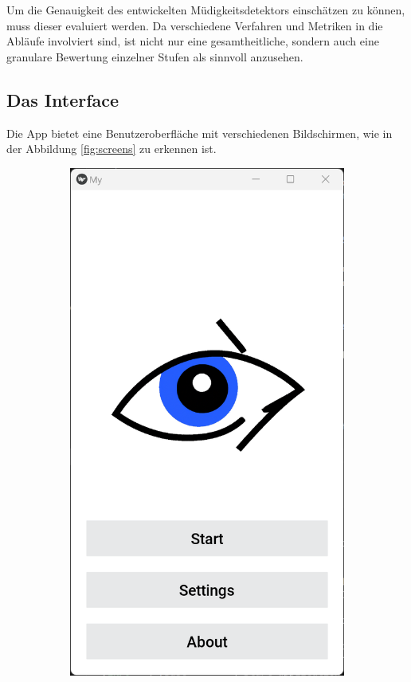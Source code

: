 Um die Genauigkeit des entwickelten Müdigkeitsdetektors einschätzen zu können, muss dieser evaluiert werden. Da verschiedene Verfahren und Metriken in die Abläufe involviert sind, ist nicht nur eine gesamtheitliche, sondern auch eine granulare Bewertung einzelner Stufen als sinnvoll anzusehen. 

\subsection{Das Interface}
\label{ssec:interface}

Die App bietet eine Benutzeroberfläche mit verschiedenen Bildschirmen, wie in der Abbildung \ref{fig:screens} zu erkennen ist.

\begin{figure}[h]
	\centering
	\begin{subfigure}[b]{0.22\textwidth}
		\includegraphics[width=\linewidth]{images/mainscreen.png}

\end{subfigure}
\end{figure}
